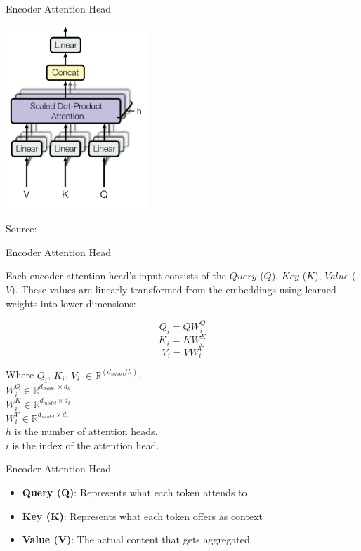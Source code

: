 \documentclass{beamer}
\begin{document}
\begin{frame}{Encoder Attention Head}
    \begin{center}
        \includegraphics[width=0.4\textwidth]{multi-head-attention_l1A3G7a.png}
        \par
        \small Source:  \cite{vaswani2017attention}
    \end{center}
\end{frame}

\begin{frame}{Encoder Attention Head}

Each encoder attention head's input consists of the $Query$ ($Q$), $Key$ ($K$), $Value$ ($V$).
These values are linearly transformed from the embeddings using learned weights into lower dimensions:

$$Q_i = QW_i^Q$$
$$K_i = KW_i^K$$
$$V_i = VW_i^V$$

Where $Q_i$, $K_i$, $V_i$ $\in \mathbb{R}^{(d_{model}/h)}$, \\
$W_i^Q \in \mathbb{R}^{d_{model} \times d_k}$ \\
$W_i^K \in \mathbb{R}^{d_{model} \times d_k}$ \\
$W_i^V \in \mathbb{R}^{d_{model} \times d_v}$ \\
$h$ is the number of attention heads.  \\
$i$ is the index of the attention head. \cite{vaswani2017attention}
\end{frame}

\begin{frame}{Encoder Attention Head}
\begin{itemize}
    \item \textbf{Query (Q)}: Represents what each token attends to
    \item \textbf{Key (K)}: Represents what each token offers as context
    \item \textbf{Value (V)}: The actual content that gets aggregated
\end{itemize}
\end{frame}
\end{document}
